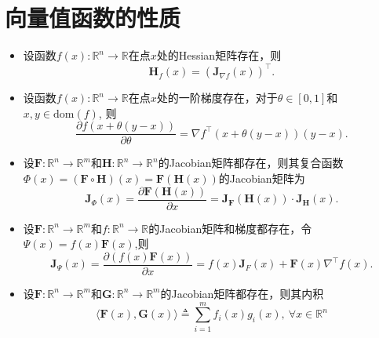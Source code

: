 \section{向量值函数的性质}
\begin{itemize}
 \setlength{\itemsep}{0pt}
 \setlength{\parsep}{0pt}
 \setlength{\parskip}{0pt}
	\item[$(1)$] 设函数$f(x): \mathbb{R}^n \to \mathbb{R}$在点$x$处的Hessian矩阵存在，则
	\begin{equation*}
		\mathbf{H}_f\left( x\right)  = \left( \mathbf{J}_{\nabla f}\left( x\right)  \right)^\top.
	\end{equation*}
	\item[$(2)$] 设函数$f(x): \mathbb{R}^n \to \mathbb{R}$在点$x$处的一阶梯度存在，对于$\theta \in [ 0,1]$和$x,y \in \mathrm{dom}(f)$, 则
	\begin{equation*}
		\dfrac{\partial f\left( x + \theta (y-x) \right) }{\partial \theta } = \nabla f^\top \left( x + \theta (y-x) \right) \left( y - x \right) .
	\end{equation*}
	\item[$(3)$] 设$\mathbf{F} : \mathbb{R}^{n} \rightarrow \mathbb{R}^{m}$和$\mathbf{H} : \mathbb{R}^{n} \rightarrow \mathbb{R}^{n}$的Jacobian矩阵都存在，则其复合函数
 $\Phi (x) = \left( \mathbf{F} \circ \mathbf{H} \right) (x) = \mathbf{F} \left( \mathbf{H} (x) \right)$的Jacobian矩阵为
	\begin{equation*}
		\mathbf{J}_{\Phi}\left( x \right) = \dfrac{\partial \mathbf{F} \left( \mathbf{H} \left( x \right) \right) }{\partial x} = \mathbf{J}_{\mathbf{F}}\left( \mathbf{H} \left( x \right) \right) \cdot \mathbf{J}_{\mathbf{H}}\left( x \right).
	\end{equation*}
 	\item[$(4)$] 设$\mathbf{F} : \mathbb{R}^{n} \rightarrow \mathbb{R}^{m}$和$f : \mathbb{R}^{n} \rightarrow \mathbb{R}$的Jacobian矩阵和梯度都存在，令$\Psi (x) = f(x) \mathbf{F}(x) $,则
	\begin{equation*}
		\mathbf{J}_{\Psi}\left( x \right) = \dfrac{\partial  \left( f(x) \mathbf{F}(x) \right) }{\partial x} = f(x) \mathbf{J}_{F}(x) + \mathbf{F}(x) \nabla^{\top} f(x)  .
	\end{equation*}
  	\item[$(5)$] 设$\mathbf{F} : \mathbb{R}^{n} \rightarrow \mathbb{R}^{m}$和$\mathbf{G}: \mathbb{R}^{n} \rightarrow \mathbb{R}^{m}$的Jacobian矩阵都存在，则其内积
   \begin{equation*}
       \langle \mathbf{F}(x), \mathbf{G}(x) \rangle \triangleq \sum_{i=1}^{m} f_{i}(x) g_{i}(x),~\forall x \in \mathbb{R}^{n}

\end{equation*}
\end{itemize}
